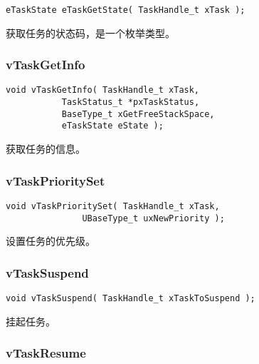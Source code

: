 \documentclass[12pt, a4paper]{article}
\begin{document}
\begin{lstlisting}[language={[ANSI]C},keywordstyle=\color{blue!70},commentstyle=\color{red!50!green!50!blue!50},frame=shadowbox, rulesepcolor=\color{red!20!green!20!blue!20}]
eTaskState eTaskGetState( TaskHandle_t xTask );
\end{lstlisting}

获取任务的状态码，是一个枚举类型。

\subsubsection {vTaskGetInfo}

\begin{lstlisting}[language={[ANSI]C},keywordstyle=\color{blue!70},commentstyle=\color{red!50!green!50!blue!50},frame=shadowbox, rulesepcolor=\color{red!20!green!20!blue!20}]
void vTaskGetInfo( TaskHandle_t xTask, 
		   TaskStatus_t *pxTaskStatus,
		   BaseType_t xGetFreeStackSpace,
		   eTaskState eState );
\end{lstlisting}

获取任务的信息。

\subsubsection {vTaskPrioritySet}

\begin{lstlisting}[language={[ANSI]C},keywordstyle=\color{blue!70},commentstyle=\color{red!50!green!50!blue!50},frame=shadowbox, rulesepcolor=\color{red!20!green!20!blue!20}]
void vTaskPrioritySet( TaskHandle_t xTask,
		       UBaseType_t uxNewPriority );
\end{lstlisting}

设置任务的优先级。

\subsubsection {vTaskSuspend}

\begin{lstlisting}[language={[ANSI]C},keywordstyle=\color{blue!70},commentstyle=\color{red!50!green!50!blue!50},frame=shadowbox, rulesepcolor=\color{red!20!green!20!blue!20}]
void vTaskSuspend( TaskHandle_t xTaskToSuspend );
\end{lstlisting}

挂起任务。

\subsubsection {vTaskResume}
\end{document}
